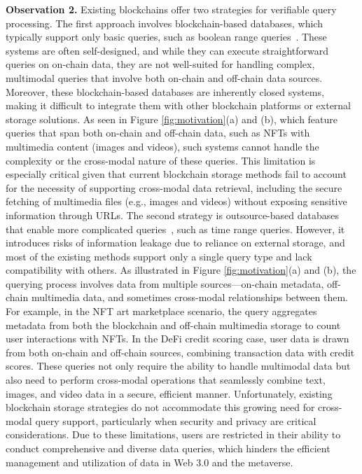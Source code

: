 \textbf{Observation 2.} 
Existing blockchains offer two strategies for verifiable query processing.
 The first approach involves blockchain-based databases, which typically support only basic queries, such as boolean range queries~\cite{chang2023anole,wang2022vchain+,xu2019vchain}. These systems are often self-designed, and while they can execute straightforward queries on on-chain data, they are not well-suited for handling complex, multimodal queries that involve both on-chain and off-chain data sources. 
Moreover, these blockchain-based databases are inherently closed systems, making it difficult to integrate them with other blockchain platforms or external storage solutions. As seen in Figure \ref{fig:motivation}(a) and (b), which feature queries that span both on-chain and off-chain data, such as NFTs with multimedia content (images and videos), such systems cannot handle the complexity or the cross-modal nature of these queries. This limitation is especially critical given that current blockchain storage methods fail to account for the necessity of supporting cross-modal data retrieval, including the secure fetching of multimedia files (e.g., images and videos) without exposing sensitive information through URLs.
 The second strategy is outsource-based databases that enable more complicated queries~\cite{antonopoulos2021sql,peng2020falcondb,yang2020ledgerdb,yue2022glassdb,zhang2017vsql,zhang2015integridb}, such as time range queries. However, it introduces risks of information leakage due to reliance on external storage, and most of the existing methods support only a single query type and lack compatibility with others.
As illustrated in Figure \ref{fig:motivation}(a) and (b), the querying process involves data from multiple sources—on-chain metadata, off-chain multimedia data, and sometimes cross-modal relationships between them. For example, in the NFT art marketplace scenario, the query aggregates metadata from both the blockchain and off-chain multimedia storage to count user interactions with NFTs. In the DeFi credit scoring case, user data is drawn from both on-chain and off-chain sources, combining transaction data with credit scores. These queries not only require the ability to handle multimodal data but also need to perform cross-modal operations that seamlessly combine text, images, and video data in a secure, efficient manner. Unfortunately, existing blockchain storage strategies do not accommodate this growing need for cross-modal query support, particularly when security and privacy are critical considerations.
Due to these limitations, users are restricted in their ability to conduct comprehensive and diverse data queries, which hinders the efficient management and utilization of data in Web 3.0 and the metaverse.


